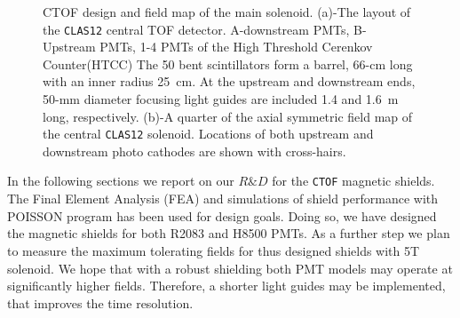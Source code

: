 \documentclass[12pt]{article}
\begin{document}
\begin{figure}[htbp]
\centering
{}
\qquad
{}
\caption{\small{CTOF design and field map of the main solenoid. 
(a)-The layout of the {\tt CLAS12} central TOF detector.
A-downstream PMTs, B-Upstream PMTs, 1-4 PMTs of the High Threshold Cerenkov Counter(HTCC)  
The 50 bent scintillators form a barrel,
66-cm long with an inner radius 25~cm. 
At the upstream and downstream ends, 50-mm diameter focusing light guides are 
included 1.4 and  1.6~m long, respectively.
(b)-{A quarter of the axial symmetric field map of 
the central {\tt CLAS12} solenoid. Locations of both upstream and downstream
photo cathodes  are shown with cross-hairs.}
\label{fig:ctofmap}}}
\end{figure}
%
In the following sections  we report on our $R\&D$ for the {\tt CTOF} magnetic shields.
The Final Element Analysis (FEA) and    simulations of shield performance
with POISSON program  has been used for 
design goals.  Doing so, we have  
designed the magnetic shields for both R2083 and H8500 PMTs.
As a further step  we  plan to  measure the maximum tolerating  fields for thus 
designed shields with 5T solenoid.  We hope that  with a robust  shielding both PMT  models 
may operate at significantly higher fields. Therefore,  a  shorter light guides may  be implemented,
that   improves  the  time resolution.
%
\end{document}
